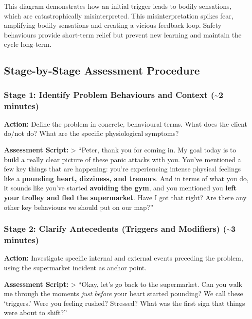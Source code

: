 \documentclass[
  american,
  letterpaper,
  DIV=11,
  numbers=noendperiod]{scrartcl}
\begin{document}
This diagram demonstrates how an initial trigger leads to bodily
sensations, which are catastrophically misinterpreted. This
misinterpretation spikes fear, amplifying bodily sensations and creating
a vicious feedback loop. Safety behaviours provide short-term relief but
prevent new learning and maintain the cycle long-term.

\subsection{Stage-by-Stage Assessment
Procedure}\label{stage-by-stage-assessment-procedure}

\subsubsection{Stage 1: Identify Problem Behaviours and Context
(\textasciitilde2
minutes)}\label{stage-1-identify-problem-behaviours-and-context-2-minutes}

\textbf{Action:} Define the problem in concrete, behavioural terms. What
does the client do/not do? What are the specific physiological symptoms?

\textbf{Assessment Script:} \textgreater{} ``Peter, thank you for coming
in. My goal today is to build a really clear picture of these panic
attacks with you. You've mentioned a few key things that are happening:
you're experiencing intense physical feelings like a \textbf{pounding
heart, dizziness, and tremors}. And in terms of what you do, it sounds
like you've started \textbf{avoiding the gym}, and you mentioned you
\textbf{left your trolley and fled the supermarket}. Have I got that
right? Are there any other key behaviours we should put on our map?''

\subsubsection{Stage 2: Clarify Antecedents (Triggers and Modifiers)
(\textasciitilde3
minutes)}\label{stage-2-clarify-antecedents-triggers-and-modifiers-3-minutes}

\textbf{Action:} Investigate specific internal and external events
preceding the problem, using the supermarket incident as anchor point.

\textbf{Assessment Script:} \textgreater{} ``Okay, let's go back to the
supermarket. Can you walk me through the moments \emph{just before} your
heart started pounding? We call these `triggers.' Were you feeling
rushed? Stressed? What was the first sign that things were about to
shift?''
\end{document}
